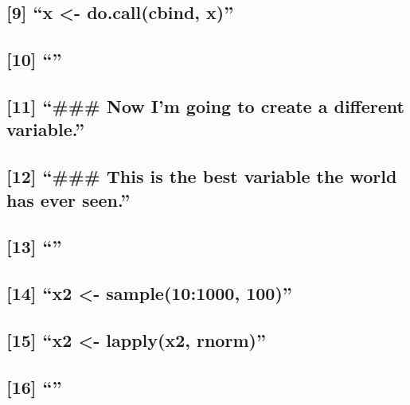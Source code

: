 \documentclass[]{article}
\begin{document}
\subsection{\texorpdfstring{{[}9{]} ``x \textless{}- do.call(cbind,
x)''}{{[}9{]} x \textless{}- do.call(cbind, x)}}\label{x---do.callcbind-x}

\subsection{\texorpdfstring{{[}10{]} ``''}{{[}10{]} }}\label{section}

\subsection{\texorpdfstring{{[}11{]} ``\#\#\# Now I'm going to create a
different
variable.''}{{[}11{]} \#\#\# Now I'm going to create a different variable.}}\label{now-im-going-to-create-a-different-variable.}

\subsection{\texorpdfstring{{[}12{]} ``\#\#\# This is the best variable
the world has ever
seen.''}{{[}12{]} \#\#\# This is the best variable the world has ever seen.}}\label{this-is-the-best-variable-the-world-has-ever-seen.}

\subsection{\texorpdfstring{{[}13{]} ``''}{{[}13{]} }}\label{section-1}

\subsection{\texorpdfstring{{[}14{]} ``x2 \textless{}- sample(10:1000,
100)''}{{[}14{]} x2 \textless{}- sample(10:1000, 100)}}\label{x2---sample101000-100}

\subsection{\texorpdfstring{{[}15{]} ``x2 \textless{}- lapply(x2,
rnorm)''}{{[}15{]} x2 \textless{}- lapply(x2, rnorm)}}\label{x2---lapplyx2-rnorm}

\subsection{\texorpdfstring{{[}16{]} ``''}{{[}16{]} }}\label{section-2}
\end{document}
